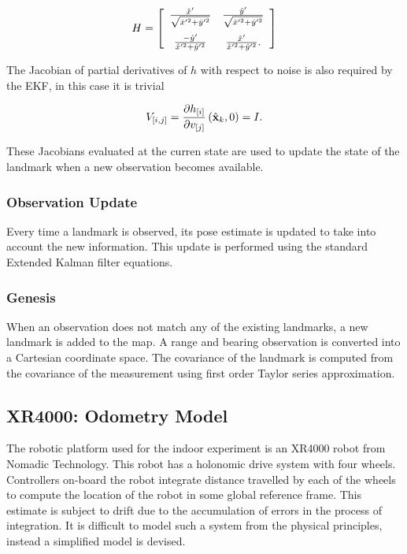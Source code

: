 $$
H = 
 \left[ \begin {array}{cc}
   \frac{\hat{x}'}{ \sqrt{\hat{x}'^2+\hat{y}'^2} } & 
   \frac{\hat{y}'}{ \sqrt{\hat{x}'^2+\hat{y}'^2} } \\ \noalign{\medskip}
   \frac{-\hat{y}'}{ \hat{x}'^2+\hat{y}'^2 } & 
   \frac{ \hat{x}'}{ \hat{x}'^2+\hat{y}'^2 }.
\end{array} \right] 
$$

The Jacobian of partial derivatives of $h$ with respect
to noise is also required by the EKF, in this case it is trivial

$$
V_{[i,j]} = \frac{\partial h_{[i]}}{\partial v_{[j]}}
             \left(\hat{\bf x}_k , 0 \right) = I.
$$

These Jacobians evaluated at the curren state are used to update the
state of the landmark when a new observation becomes available.


\subsubsection{Observation Update}

Every time a landmark is observed, its pose estimate is updated to
take into account the new information. This update is performed using
the standard Extended Kalman filter equations.


\subsubsection{Genesis}

When an observation does not match any of the existing landmarks, a
new landmark is added to the map. A range and bearing observation is
converted into a Cartesian coordinate space. The covariance of the
landmark is computed from the covariance of the measurement using
first order Taylor series approximation.


\subsection{XR4000: Odometry Model}

The robotic platform used for the indoor experiment is an XR4000 robot
from Nomadic Technology. This robot has a holonomic drive system with
four wheels. Controllers on-board the robot integrate distance
travelled by each of the wheels to compute the location of the robot
in some global reference frame. This estimate is subject to drift
due to the accumulation of errors in the process of integration. It is
difficult to model such a system from the physical principles, instead
a simplified model is devised.

